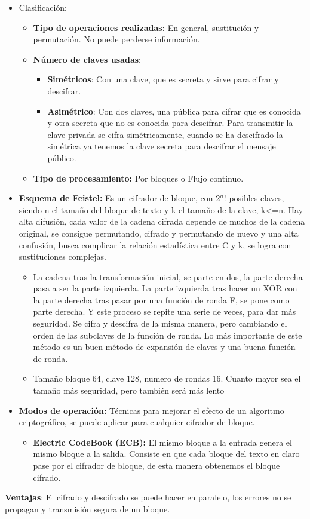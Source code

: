 \documentclass[12pt, twoside, openright]{report} %
\begin{document}
\begin{itemize}
	\item Clasificación:
	      \begin{itemize}
		      \item \textbf{Tipo de operaciones realizadas:} En general, sustitución y permutación. No puede perderse información.
		      \item \textbf{Número de claves usadas}:
		            \begin{itemize}
			            \item \textbf{Simétricos}: Con una clave, que es secreta y sirve para cifrar y descifrar.
			            \item \textbf{Asimétrico}: Con dos claves, una pública para cifrar que es conocida y otra secreta que no es conocida para descifrar. Para transmitir la clave privada se cifra simétricamente, cuando se ha descifrado la simétrica ya tenemos la clave secreta para descifrar el mensaje público.
		            \end{itemize}
		      \item \textbf{Tipo de procesamiento:} Por bloques o Flujo continuo.
	      \end{itemize}
	\item \textbf{Esquema de Feistel:} Es un cifrador de bloque, con $2^n$! posibles claves, siendo n el tamaño del bloque de texto y k el tamaño de la clave, k\textless=n. Hay alta difusión, cada valor de la cadena cifrada depende de muchos de la cadena original, se consigue permutando, cifrado y permutando de nuevo y una alta confusión, busca complicar la relación estadística entre C y k, se logra con sustituciones complejas.
	      \begin{itemize}
		      \item La cadena tras la transformación inicial, se parte en dos, la parte derecha pasa a ser la parte izquierda. La parte izquierda tras hacer un XOR con la parte derecha tras pasar por una función de ronda F, se pone como parte derecha. Y este proceso se repite una serie de veces, para dar más seguridad. Se cifra y descifra de la misma manera, pero cambiando el orden de las subclaves de la función de ronda. Lo más importante de este método es un buen método de expansión de claves y una buena función de ronda.
		      \item Tamaño bloque 64, clave 128, numero de rondas 16. Cuanto mayor sea el tamaño más seguridad, pero también será más lento
	      \end{itemize}
	\item \textbf{Modos de operación:} Técnicas para mejorar el efecto de un algoritmo criptográfico, se puede aplicar para cualquier cifrador de bloque.
	      \begin{itemize}
		      \item \textbf{Electric CodeBook (ECB):} El mismo bloque a la entrada genera el mismo bloque a la salida. Consiste en que cada bloque del texto en claro pase por el cifrador de bloque, de esta manera obtenemos el bloque cifrado.
	      \end{itemize}
\end{itemize}
\textbf{Ventajas}: El cifrado y descifrado se puede hacer en paralelo, los errores no se propagan y transmisión segura de un bloque.
\end{document}
